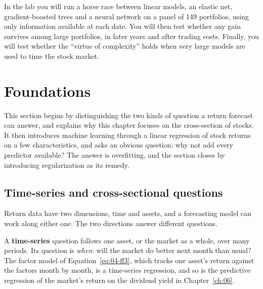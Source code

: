 In the lab you will run a horse race between linear models, an elastic net, gradient-boosted trees and a neural network on a panel of 149 portfolios, using only information available at each date. You will then test whether any gain survives among large portfolios, in later years and after trading costs. Finally, you will test whether the ``virtue of complexity'' holds when very large models are used to time the stock market.


\section{Foundations}
\label{sec:20-foundations}

This section begins by distinguishing the two kinds of question a return forecast can answer, and explains why this chapter focuses on the cross-section of stocks. It then introduces machine learning through a linear regression of stock returns on a few characteristics, and asks an obvious question: why not add every predictor available? The answer is overfitting, and the section closes by introducing regularization as its remedy.

\subsection{Time-series and cross-sectional questions}
\label{sec:20-crosssection}

Return data have two dimensions, time and assets, and a forecasting model can work along either one. The two directions answer different questions.

A \textbf{time-series} question follows one asset, or the market as a whole, over many periods. Its question is \emph{when}: will the market do better next month than usual? The factor model of Equation~\eqref{eq:04-ff3}, which tracks one asset's return against the factors month by month, is a time-series regression, and so is the predictive regression of the market's return on the dividend yield in Chapter~\ref{ch:06}.

